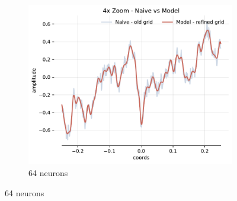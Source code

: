\begin{figure}[!h]
\begin{subfigure}[b]{0.32\textwidth}
        \centering
        \includegraphics[width=\textwidth]{img/ch3/4x-zoom-noise-1hl-64hf-w8.pdf}
        \caption{64 neurons}
        \label{fig:4x-zoom-pred-noise-1hl-64hf-w8}
    \end{subfigure}


\end{figure}

